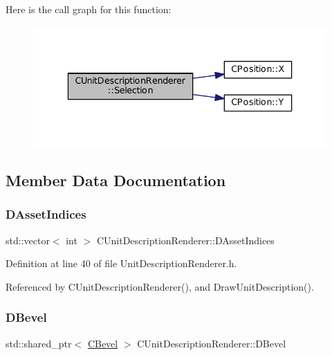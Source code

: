 Here is the call graph for this function\+:\nopagebreak
\begin{figure}[H]
\begin{center}
\leavevmode
\includegraphics[width=336pt]{classCUnitDescriptionRenderer_a6ef0c9f010b5502def622e6d830795c7_cgraph}
\end{center}
\end{figure}


\subsection{Member Data Documentation}
\hypertarget{classCUnitDescriptionRenderer_a3d311375ab23745786d20076842e3099}{}\label{classCUnitDescriptionRenderer_a3d311375ab23745786d20076842e3099} 
\subsubsection{\texorpdfstring{D\+Asset\+Indices}{DAssetIndices}}
{\footnotesize\ttfamily std\+::vector$<$ int $>$ C\+Unit\+Description\+Renderer\+::\+D\+Asset\+Indices\hspace{0.3cm}{\ttfamily [protected]}}



Definition at line 40 of file Unit\+Description\+Renderer.\+h.



Referenced by C\+Unit\+Description\+Renderer(), and Draw\+Unit\+Description().

\hypertarget{classCUnitDescriptionRenderer_a9f4cd9f9d8dbc5036c885980494db41e}{}\label{classCUnitDescriptionRenderer_a9f4cd9f9d8dbc5036c885980494db41e} 
\subsubsection{\texorpdfstring{D\+Bevel}{DBevel}}
{\footnotesize\ttfamily std\+::shared\+\_\+ptr$<$ \hyperlink{classCBevel}{C\+Bevel} $>$ C\+Unit\+Description\+Renderer\+::\+D\+Bevel\hspace{0.3cm}{\ttfamily [protected]}}



